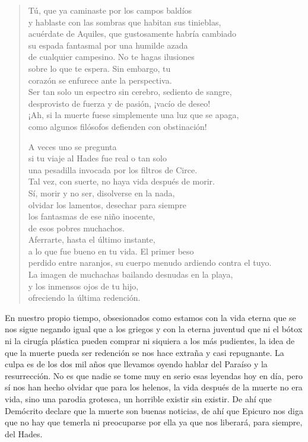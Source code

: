 \begin{verse}
Tú, que ya caminaste por los campos baldíos\\
y hablaste con las sombras que habitan sus tinieblas,\\
acuérdate de Aquiles, que gustosamente habría cambiado\\
su espada fantasmal por una humilde azada\\
de cualquier campesino. No te hagas ilusiones\\
sobre lo que te espera. Sin embargo, tu\\
corazón se enfurece ante la perspectiva.\\
Ser tan solo un espectro sin cerebro, sediento de sangre,\\
desprovisto de fuerza y de pasión, ¡vacío de deseo!\\
¡Ah, si la muerte fuese simplemente una luz que se apaga,\\
como algunos filósofos defienden con obstinación!

A veces uno se pregunta\\
si tu viaje al Hades fue real o tan solo\\
una pesadilla invocada por los filtros de Circe.\\
Tal vez, con suerte, no haya vida después de morir.\\
Sí, morir y no ser, disolverse en la nada,\\
olvidar los lamentos, desechar para siempre\\
los fantasmas de ese niño inocente,\\
de esos pobres muchachos.\\
Aferrarte, hasta el último instante,\\
a lo que fue bueno en tu vida. El primer beso\\
perdido entre naranjos, su cuerpo menudo ardiendo contra el tuyo.\\
La imagen de muchachas bailando desnudas en la playa,\\
y los inmensos ojos de tu hijo,\\
ofreciendo la última redención.
\end{verse}

En nuestro propio tiempo, obsesionados como estamos con la vida eterna que se nos sigue negando igual que a los griegos y con la eterna juventud que ni el bótox ni la cirugía plástica pueden comprar ni siquiera a los más pudientes, la idea de que la muerte pueda ser redención se nos hace extraña y casi repugnante. La culpa es de los dos mil años que llevamos oyendo hablar del Paraíso y la resurrección. No es que nadie se tome muy en serio esas leyendas hoy en día, pero sí nos han hecho olvidar que para los helenos, la vida después de la muerte no era vida, sino una parodia grotesca, un horrible existir sin existir. De ahí que Demócrito declare que la muerte son buenas noticias, de ahí que Epicuro nos diga que no hay que temerla ni preocuparse por ella ya que nos liberará, para siempre, del Hades.
